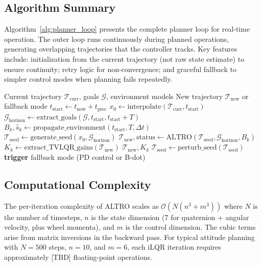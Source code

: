 \documentclass[conference]{IEEEtran}
\begin{document}
\subsection{Algorithm Summary}\label{subsec:algorithm_summary}

Algorithm~\ref{alg:planner_loop} presents the complete planner loop for real-time operation. The outer loop runs continuously during planned operations, generating overlapping trajectories that the controller tracks. Key features include: initialization from the current trajectory (not raw state estimate) to ensure continuity; retry logic for non-convergence; and graceful fallback to simpler control modes when planning fails repeatedly.

\begin{algorithm}[t]
\caption{Attitude Trajectory Planner Loop}
\label{alg:planner_loop}
\begin{algorithmic}[1]
\REQUIRE Current trajectory $\mathcal{T}_{\text{curr}}$, goals $\mathcal{G}$, environment models
\ENSURE New trajectory $\mathcal{T}_{\text{new}}$ or fallback mode
\STATE $t_{\text{start}} \gets t_{\text{now}} + t_{\text{prec}}$
\STATE $x_0 \gets \text{interpolate}(\mathcal{T}_{\text{curr}}, t_{\text{start}})$ 
\STATE $\mathcal{G}_{\text{horizon}} \gets \text{extract\_goals}(\mathcal{G}, t_{\text{start}}, t_{\text{start}} + T)$
\STATE $B_k, \hat{s}_k \gets \text{propagate\_environment}(t_{\text{start}}, T, \Delta t)$
\STATE $\mathcal{T}_{\text{seed}} \gets \text{generate\_seed}(x_0, \mathcal{G}_{\text{horizon}})$
    \STATE $\mathcal{T}_{\text{new}}, \text{status} \gets \text{ALTRO}(\mathcal{T}_{\text{seed}}, \mathcal{G}_{\text{horizon}}, B_k)$
        \STATE $K_k \gets \text{extract\_TVLQR\_gains}(\mathcal{T}_{\text{new}})$
        \RETURN $\mathcal{T}_{\text{new}}, K_k$
    \ENDIF
    \STATE $\mathcal{T}_{\text{seed}} \gets \text{perturb\_seed}(\mathcal{T}_{\text{seed}})$
\ENDFOR
\STATE \textbf{trigger} fallback mode (PD control or B-dot)
\end{algorithmic}
\end{algorithm}

\subsection{Computational Complexity}\label{subsec:complexity}

The per-iteration complexity of ALTRO scales as $\mathcal{O}(N(n^3 + m^3))$ where $N$ is the number of timesteps, $n$ is the state dimension (7 for quaternion + angular velocity, plus wheel momenta), and $m$ is the control dimension. The cubic terms arise from matrix inversions in the backward pass. For typical attitude planning with $N=500$ steps, $n=10$, and $m=6$, each iLQR iteration requires approximately [TBD] floating-point operations.
\end{document}
